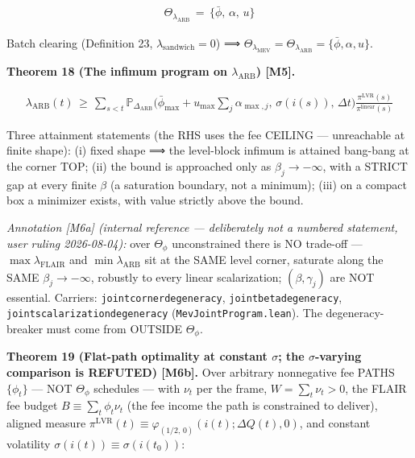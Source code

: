 \documentclass[11pt]{article}
\renewcommand{\_}{\textunderscore\allowbreak}
\begin{document}
\[
    \begin{aligned}
        \Theta_{\lambda_{\text{ARB}}} \, = \, \{\bar\phi,\, \alpha,\, u\}
    \end{aligned}
\]

Batch clearing (Definition 23, \(\lambda_{\text{sandwich}} = 0\)) ⟹ \(\Theta_{\lambda_{\text{MEV}}} = \Theta_{\lambda_{\text{ARB}}} = \{\bar\phi, \alpha, u\}\).

\textbf{Theorem 18 (The infimum program on \(\lambda_{\text{ARB}}\)) {[}M5{]}.}

\[
    \begin{aligned}
        \lambda_{\text{ARB}}(t) \, \geq \, \sum_{s<t} \mathbb{P}_{\Delta_{\text{ARB}}}\Big(\bar\phi_{\max} + u_{\max}\textstyle\sum_j \alpha_{\max,j},\, \sigma(i(s)),\, \Delta t\Big)\frac{\pi^{\mathrm{LVR}}(s)}{\pi^{\text{linear}}(s)}
    \end{aligned}
\]

Three attainment statements (the RHS uses the fee CEILING --- unreachable at finite shape): (i) fixed shape ⟹ the level-block infimum is attained bang-bang at the corner TOP; (ii) the bound is approached only as \(\beta_j \to -\infty\), with a STRICT gap at every finite \(\beta\) (a saturation boundary, not a minimum); (iii) on a compact box a minimizer exists, with value strictly above the bound.

\emph{Annotation {[}M6a{]} (internal reference --- deliberately not a numbered statement, user ruling 2026-08-04):} over \(\Theta_{\phi}\) unconstrained there is NO trade-off --- \(\max \lambda_{\text{FLAIR}}\) and \(\min \lambda_{\text{ARB}}\) sit at the SAME level corner, saturate along the SAME \(\beta_j \to -\infty\), robustly to every linear scalarization; \((\beta, \gamma_j)\) are NOT essential. Carriers: \texttt{joint\_corner\_degeneracy}, \texttt{joint\_beta\_degeneracy}, \texttt{joint\_scalarization\_degeneracy} (\texttt{MevJointProgram.lean}). The degeneracy-breaker must come from OUTSIDE \(\Theta_{\phi}\).

\textbf{Theorem 19 (Flat-path optimality at constant \(\sigma\); the \(\sigma\)-varying comparison is REFUTED) {[}M6b{]}.} Over arbitrary nonnegative fee PATHS \(\{\phi_t\}\) --- NOT \(\Theta_{\phi}\) schedules --- with \(\nu_t\) per the frame, \(W = \sum_t \nu_t > 0\), the FLAIR fee budget \(B \equiv \sum_t \phi_t\nu_t\) (the fee income the path is constrained to deliver), aligned measure \(\pi^{\mathrm{LVR}}(t) \equiv \varphi_{(1/2,\,0)}(i(t); \Delta Q(t), 0)\), and constant volatility \(\sigma(i(t)) \equiv \sigma(i(t_0))\):
\end{document}
